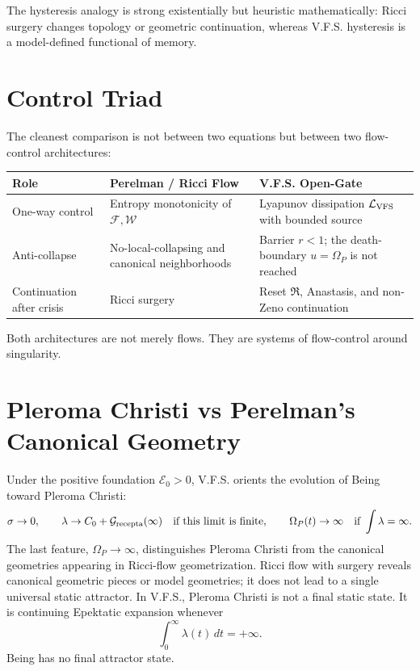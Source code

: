 \documentclass[11pt]{article}
\newcommand{\VFS}{V.F.S.}
\newcommand{\Grec}{\mathcal{G}_{\rm recepta}}
\newcommand{\Om}{\Omega_P}
\newcommand{\Ezero}{\mathcal{E}_0}
\begin{document}
The hysteresis analogy is strong existentially but heuristic mathematically: Ricci surgery changes topology or geometric continuation, whereas \VFS{} hysteresis is a model-defined functional of memory.

\section{Control Triad}

The cleanest comparison is not between two equations but between two flow-control architectures:

\begin{longtable}{>{\raggedright\arraybackslash}p{} >{\raggedright\arraybackslash}p{} >{\raggedright\arraybackslash}p{}}
\toprule
Role & Perelman / Ricci Flow & V.F.S. Open-Gate \\
\midrule
One-way control & Entropy monotonicity of $\mathcal F,\mathcal W$ & Lyapunov dissipation $\mathcal L_{\rm VFS}$ with bounded source \\
Anti-collapse & No-local-collapsing and canonical neighborhoods & Barrier $r<1$; the death-boundary $u=\Om$ is not reached \\
Continuation after crisis & Ricci surgery & Reset $\mathfrak R$, Anastasis, and non-Zeno continuation \\
\bottomrule
\end{longtable}

Both architectures are not merely flows. They are systems of flow-control around singularity.

\section{Pleroma Christi vs Perelman's Canonical Geometry}

Under the positive foundation $\Ezero>0$, \VFS{} orients the evolution of Being toward Pleroma Christi:
\begin{equation}
\sigma\to0,
\qquad
\lambda\to C_0+\Grec(\infty) \quad\text{if this limit is finite},
\qquad
\Om(t)\to\infty \quad\text{if }\int \lambda=\infty.
\end{equation}
The last feature, $\Om\to\infty$, distinguishes Pleroma Christi from the canonical geometries appearing in Ricci-flow geometrization. Ricci flow with surgery reveals canonical geometric pieces or model geometries; it does not lead to a single universal static attractor. In \VFS{}, Pleroma Christi is not a final static state. It is continuing Epektatic expansion whenever
\begin{equation}
\int_0^\infty\lambda(t)\,dt=+\infty.
\end{equation}
Being has no final attractor state.
\end{document}
